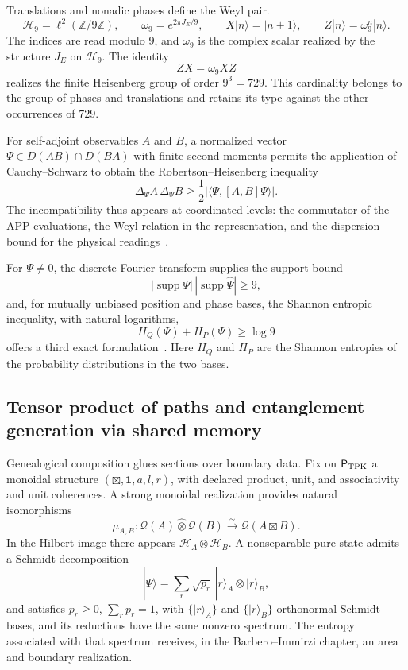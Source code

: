 Translations and nonadic phases define the Weyl pair.
\[
 \mathcal H_9=\ell^2(\mathbb Z/9\mathbb Z),
 \qquad
 \omega_9=e^{2\pi J_E/9},
 \qquad
 X|n\rangle=|n+1\rangle,
 \qquad
 Z|n\rangle=\omega_9^n|n\rangle.
\]
The indices are read modulo \(9\), and \(\omega_9\) is the complex scalar
realized by the structure \(J_E\) on \(\mathcal H_9\).
The identity
\[
 ZX=\omega_9XZ
\]
realizes the finite Heisenberg group of order \(9^3=729\). This cardinality
belongs to the group of phases and translations and retains its type against the
other occurrences of \(729\).

For self-adjoint observables \(A\) and \(B\), a normalized vector
\(\Psi\in D(AB)\cap D(BA)\) with finite second moments permits the application of
Cauchy--Schwarz to obtain the
Robertson--Heisenberg inequality
\begin{equation}
 \Delta_\Psi A\,\Delta_\Psi B
 \geq\frac12
 \bigl|\langle\Psi,[A,B]\Psi\rangle\bigr|.
 \label{eq:robertson-hmt-rev2}
\end{equation}
The incompatibility thus appears at coordinated levels: the commutator of
the APP evaluations, the Weyl relation in the representation, and the dispersion
bound for the physical readings~\cite{Heisenberg1927,Robertson1929}.

For \(\Psi\neq0\), the discrete Fourier transform supplies the support bound
\[
 |\operatorname{supp}\Psi|\,
 |\operatorname{supp}\widehat\Psi|\geq9,
\]
and, for mutually unbiased position and phase bases, the Shannon entropic
inequality, with natural logarithms,
\[
 H_Q(\Psi)+H_P(\Psi)\geq\log9
\]
offers a third exact formulation~\cite{MaassenUffink1988}. Here
\(H_Q\) and \(H_P\) are the Shannon entropies of the probability
distributions in the two bases.

\subsection{Tensor product of paths and entanglement generation via shared memory}

Genealogical composition glues sections over boundary data. Fix
on \(\mathsf P_{\rm TPK}\) a monoidal structure
\((\boxtimes,\mathbf 1,a,l,r)\), with declared product, unit, and associativity
and unit coherences. A strong monoidal realization
provides natural isomorphisms
\[
 \mu_{A,B}:
 \mathcal Q(A)\widehat\otimes\mathcal Q(B)
 \xrightarrow{\sim}\mathcal Q(A\boxtimes B).
\]
In the Hilbert image there appears
\(\mathcal H_A\otimes\mathcal H_B\). A nonseparable pure state admits a
Schmidt decomposition
\[
 |\Psi\rangle
 =\sum_r\sqrt{p_r}\,|r\rangle_A\otimes|r\rangle_B,
\]
and satisfies \(p_r\geq0\), \(\sum_rp_r=1\), with
\(\{|r\rangle_A\}\) and \(\{|r\rangle_B\}\) orthonormal Schmidt bases,
and its reductions have the same nonzero spectrum. The entropy associated with
that spectrum receives, in the Barbero--Immirzi chapter, an area and boundary
realization.

